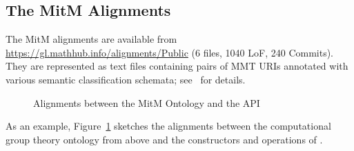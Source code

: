 \subsection{The MitM Alignments}

The MitM alignments are available from \url{https://gl.mathhub.info/alignments/Public} (6
files, 1040 LoF, 240 Commits). They are represented as text files containing pairs of MMT
URIs annotated with various semantic classification schemata;
see~\cite{MueGauKal:cacfms17} for details.
\begin{figure}[ht]\centering
  \caption{Alignments between the MitM Ontology and the \GAP API}\label{fig:cgtontology}
\end{figure}

As an example, Figure~\ref{fig:cgtontology} sketches the alignments between the
computational group theory ontology from above and the constructors and operations of
\GAP.


